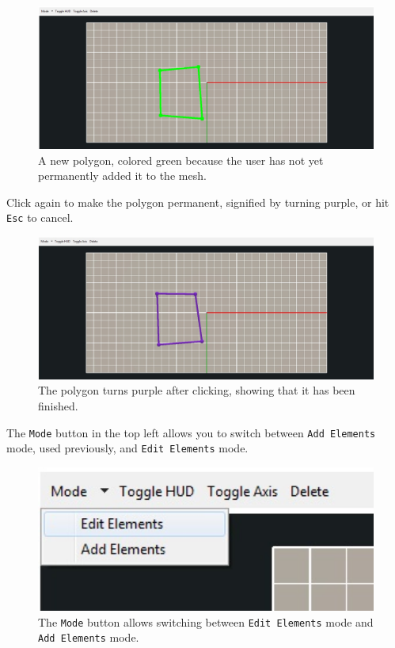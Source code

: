 \begin{figure}[!h]
\includegraphics[width=12cm]{images/AddPolygon}
\centering
\caption{A new polygon, colored green because the user has not yet permanently
added it to the mesh.}
\label{fig:addpolygon}
\end{figure}

Click again to make the polygon permanent, signified by turning purple, or hit
\texttt{Esc} to cancel.

\begin{figure}[!h]
\includegraphics[width=12cm]{images/NewPolygon}
\centering
\caption{The polygon turns purple after clicking, showing that it has been
finished.}
\label{fig:newpolygon}
\end{figure}

The \texttt{Mode} button in the top left allows you to switch between
\texttt{Add Elements} mode, used previously, and \texttt{Edit Elements} mode.

\begin{figure}[!h]
\includegraphics[width=12cm]{images/EditMode}
\centering
\caption{The \texttt{Mode} button allows switching between \texttt{Edit
Elements} mode and \texttt{Add Elements} mode.}
\label{fig:editmode}
\end{figure}

